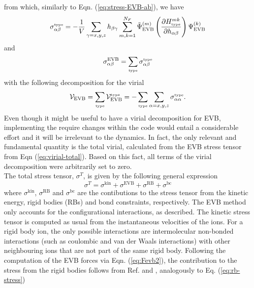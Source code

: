 from which, similarly to Eqn. (\ref{eq:stress-EVB-ab}), we have  
\begin{equation}\label{eq:stress-type-ab2}
\sigma_{\alpha\beta}^{\text{\tiny{type}}}=-\frac{1}{V}\sum_{\gamma=x,y,z}h_{\beta\gamma}\sum_{m,k=1}^{N_F} \tilde{\Psi}^{(m)}_{\text{EVB}} \left(\frac{\partial H^{mk}_{\text{\tiny{type}}}}{\partial h_{\alpha\beta}}\right) \Psi^{(k)}_{\text{EVB}}
\end{equation}
and
\begin{equation}\label{eq:stress-type-ab1}
\sigma_{\alpha\beta}^{\text{EVB}}=\sum_{\text{\tiny{type}}}\sigma_{\alpha\beta}^{\text{\tiny{type}}}
\end{equation}
with the following decomposition for the virial
\begin{equation}\label{eq:virial-decomp}
\mathcal{V}_{\text{EVB}}=\sum_{\text{\tiny{type}}}\mathcal{V}^{\text{\tiny{type}}}_{\text{EVB}}= -\sum_{\text{\tiny{type}}}\sum_{\alpha=x,y,z} \sigma_{\alpha\alpha}^{\text{\tiny{type}}}.
\end{equation}
Even though it might be useful to have a virial decomposition for EVB, implementing the require changes within the code would entail a considerable effort and it will be irrelevant to the dynamics. In fact, the only relevant and fundamental quantity is the total virial, calculated from the EVB stress tensor from Eqn (\ref{eq:virial-total}). Based on this fact, all terms of the virial decomposition were arbitrarily set to zero.\\
The total stress tensor, $\sigma^{T}$, is given by the following general expression
\begin{equation}\label{eq:stress-total}
\sigma^{T}=\sigma^{\text{kin}}+\sigma^{\text{EVB}}+\sigma^{\text{RB}}+\sigma^{\text{bc}}
\end{equation}
where $\sigma^{\text{kin}}$, $\sigma^{\text{RB}}$ and $\sigma^{\text{bc}}$ are the contibutions to the stress tensor from the kinetic energy, rigid bodies (RBs) and bond constraints, respectively. The EVB method only accounts for the configurational interactions, as described. The kinetic stress tensor is computed as usual from the instantaneous velocities of the ions. For a rigid body ion, the only possible interactions are intermolecular non-bonded interactions (such as coulombic and van der Waals interactions) with other neighbouring ions that are not part of the same rigid body. Following the computation of the EVB forces via Eqn. (\ref{eq:Fevb2}), the contribution to the stress from the rigid bodies follows from Ref. \cite{smith87-c} and \cite{essmann1995}, analogously to Eq. (\ref{eq:rb-stress})
